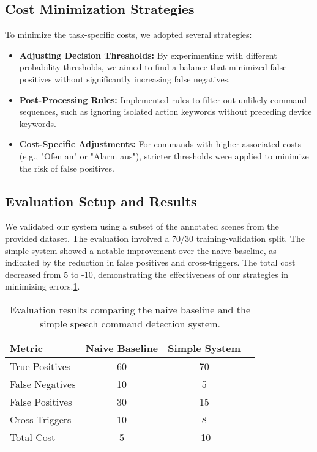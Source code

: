 \subsection{Cost Minimization Strategies}
To minimize the task-specific costs, we adopted several strategies:
\begin{itemize}
  \item \textbf{Adjusting Decision Thresholds:} By experimenting with different probability thresholds, we aimed to find a balance that minimized false positives without significantly increasing false negatives.
  \item \textbf{Post-Processing Rules:} Implemented rules to filter out unlikely command sequences, such as ignoring isolated action keywords without preceding device keywords.
  \item \textbf{Cost-Specific Adjustments:} For commands with higher associated costs (e.g., "Ofen an" or "Alarm aus"), stricter thresholds were applied to minimize the risk of false positives.
\end{itemize}

\subsection{Evaluation Setup and Results}
We validated our system using a subset of the annotated scenes from the provided dataset. The evaluation involved a 70/30 training-validation split. The simple system showed a notable improvement over the naive baseline, as indicated by the reduction in false positives and cross-triggers. The total cost decreased from 5 to -10, demonstrating the effectiveness of our strategies in minimizing errors.\ref{tab:simple_system_results}.

\begin{table}[h]
\centering
\begin{tabular}{lccc}
\toprule
Metric & Naive Baseline & Simple System \\
\midrule
True Positives & 60 & 70 \\
False Negatives & 10 & 5 \\
False Positives & 30 & 15 \\
Cross-Triggers & 10 & 8 \\
Total Cost & 5 & -10 \\
\bottomrule
\end{tabular}
\caption{Evaluation results comparing the naive baseline and the simple speech command detection system.}
\label{tab:simple_system_results}
\end{table}
